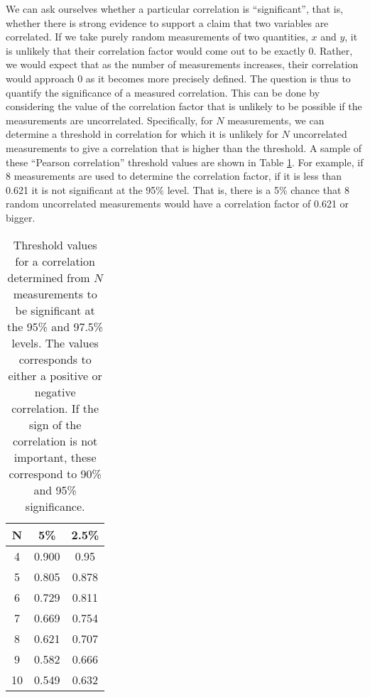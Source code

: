 We can ask ourselves whether a particular correlation is ``significant'', that is, whether there is strong evidence to support a claim that two variables are correlated. If we take purely random measurements of two quantities, $x$ and $y$, it is unlikely that their correlation factor would come out to be exactly 0. Rather, we would expect that as the number of measurements increases, their correlation would approach 0 as it becomes more precisely defined.  The question is thus to quantify the significance of a measured correlation. This can be done by considering the value of the correlation factor that is unlikely to be possible if the measurements are uncorrelated. Specifically, for $N$ measurements, we can determine a threshold in correlation for which it is unlikely for $N$ uncorrelated measurements to give a correlation that is higher than the threshold. A sample of these ``Pearson correlation'' threshold values are shown in Table \ref{tab:PearsonCorr}. For example, if 8 measurements are used to determine the correlation factor, if it is less than 0.621 it is not significant at the 95\% level. That is, there is a 5\% chance that 8 random uncorrelated measurements would have a correlation factor of 0.621 or bigger.

\begin{table}[h!]
\center
\begin{tabular}{|c|c|c|}
\hline
\textbf{N} & \textbf{5\%} &\textbf{2.5\%}\\
\hline
4 & 0.900 &0.95 \\
5 & 0.805 &0.878 \\
6 & 0.729 &0.811 \\
7 & 0.669 &0.754 \\
8 & 0.621 &0.707 \\
9 & 0.582 &0.666 \\
10 & 0.549 &0.632 \\
\hline
\end{tabular}
\caption{\label{tab:PearsonCorr} Threshold values for a correlation determined from $N$ measurements to be significant at the 95\% and 97.5\% levels. The values corresponds to either a positive or negative correlation. If the sign of the correlation is not important, these correspond to 90\% and 95\% significance.}
\end{table}


